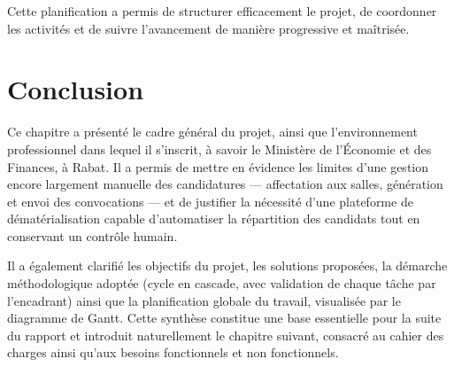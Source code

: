 \begin{onehalfspace}
Cette planification a permis de structurer efficacement le projet, de coordonner les activités et de suivre l'avancement de manière progressive et maîtrisée.

\section{Conclusion}

Ce chapitre a présenté le cadre général du projet, ainsi que l'environnement professionnel dans lequel il s'inscrit, à savoir le Ministère de l'Économie et des Finances, à Rabat. Il a permis de mettre en évidence les limites d'une gestion encore largement manuelle des candidatures --- affectation aux salles, génération et envoi des convocations --- et de justifier la nécessité d'une plateforme de dématérialisation capable d'automatiser la répartition des candidats tout en conservant un contrôle humain.

Il a également clarifié les objectifs du projet, les solutions proposées, la démarche méthodologique adoptée (cycle en cascade, avec validation de chaque tâche par l'encadrant) ainsi que la planification globale du travail, visualisée par le diagramme de Gantt. Cette synthèse constitue une base essentielle pour la suite du rapport et introduit naturellement le chapitre suivant, consacré au cahier des charges ainsi qu'aux besoins fonctionnels et non fonctionnels.

\end{onehalfspace}
